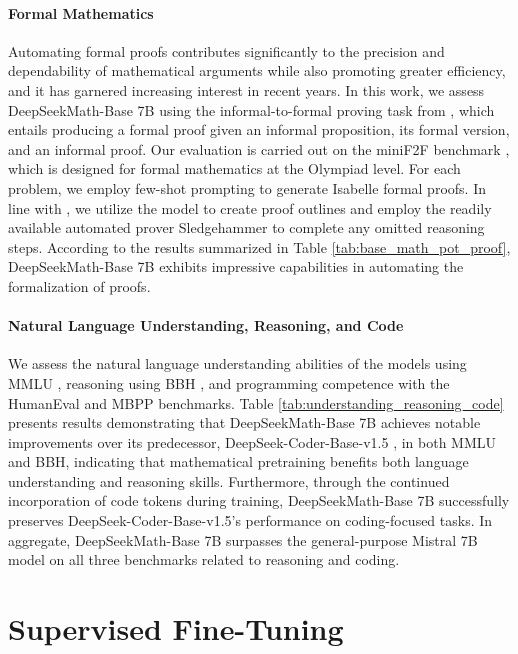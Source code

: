 \paragraph{Formal Mathematics}

Automating formal proofs contributes significantly to the precision and dependability of mathematical arguments while also promoting greater efficiency, and it has garnered increasing interest in recent years. In this work, we assess DeepSeekMath-Base 7B using the informal-to-formal proving task from \citep{dsp_proof}, which entails producing a formal proof given an informal proposition, its formal version, and an informal proof. Our evaluation is carried out on the miniF2F benchmark \citep{minif2f}, which is designed for formal mathematics at the Olympiad level. For each problem, we employ few-shot prompting to generate Isabelle formal proofs. In line with \cite{dsp_proof}, we utilize the model to create proof outlines and employ the readily available automated prover Sledgehammer \citep{sledgehammer} to complete any omitted reasoning steps. According to the results summarized in Table \ref{tab:base_math_pot_proof}, DeepSeekMath-Base 7B exhibits impressive capabilities in automating the formalization of proofs.

\paragraph{Natural Language Understanding, Reasoning, and Code}

We assess the natural language understanding abilities of the models using MMLU \citep{mmlu}, reasoning using BBH \citep{bbh}, and programming competence with the HumanEval \citep{codex} and MBPP \citep{mbpp} benchmarks. Table \ref{tab:understanding_reasoning_code} presents results demonstrating that DeepSeekMath-Base 7B achieves notable improvements over its predecessor, DeepSeek-Coder-Base-v1.5 \citep{deepseek-coder}, in both MMLU and BBH, indicating that mathematical pretraining benefits both language understanding and reasoning skills. Furthermore, through the continued incorporation of code tokens during training, DeepSeekMath-Base 7B successfully preserves DeepSeek-Coder-Base-v1.5's performance on coding-focused tasks. In aggregate, DeepSeekMath-Base 7B surpasses the general-purpose Mistral 7B \citep{mistral} model on all three benchmarks related to reasoning and coding.

\section{Supervised Fine-Tuning}

